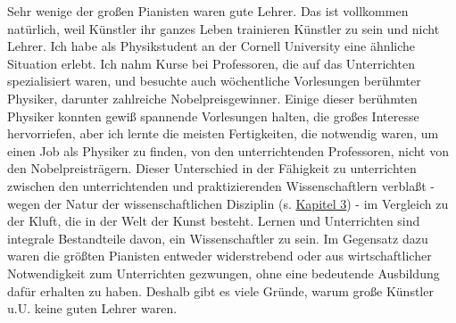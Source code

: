 Sehr wenige der großen Pianisten waren gute Lehrer.
Das ist vollkommen natürlich, weil Künstler ihr ganzes Leben trainieren Künstler zu sein und nicht Lehrer.
Ich habe als Physikstudent an der Cornell University eine ähnliche Situation erlebt. Ich nahm Kurse bei Professoren, die auf das Unterrichten spezialisiert waren, und besuchte auch wöchentliche Vorlesungen berühmter Physiker, darunter zahlreiche Nobelpreisgewinner.
Einige dieser berühmten Physiker konnten gewiß spannende Vorlesungen halten, die großes Interesse hervorriefen, aber ich lernte die meisten Fertigkeiten, die notwendig waren, um einen Job als Physiker zu finden, von den unterrichtenden Professoren, nicht von den Nobelpreisträgern.
Dieser Unterschied in der Fähigkeit zu unterrichten zwischen den unterrichtenden und praktizierenden Wissenschaftlern verblaßt - wegen der Natur der wissenschaftlichen Disziplin (s. \hyperlink{c3_1}{Kapitel 3}) - im Vergleich zu der Kluft, die in der Welt der Kunst besteht.
Lernen und Unterrichten sind integrale Bestandteile davon, ein Wissenschaftler zu sein.
Im Gegensatz dazu waren die größten Pianisten entweder widerstrebend oder aus wirtschaftlicher Notwendigkeit zum Unterrichten gezwungen, ohne eine bedeutende Ausbildung dafür erhalten zu haben.
Deshalb gibt es viele Gründe, warum große Künstler u.U. keine guten Lehrer waren.

